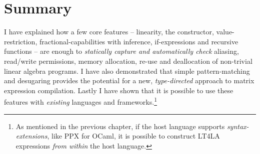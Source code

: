 \section{Summary}


I have explained how a few core features -- linearity, the 
constructor, value-restriction, fractional-capabilities with inference,
if-expressions and recursive functions -- are enough to \emph{statically
capture and automatically check} aliasing, read/write permissions, memory
allocation, re-use and deallocation of non-trivial linear algebra programs. I
have also demonstrated that simple pattern-matching and desugaring provides the
potential for a new, \emph{type-directed} approach to matrix expression
compilation. Lastly I have shown that it is possible to use these features with
\emph{existing} languages and frameworks.\footnote{As mentioned in the previous
    chapter, if the host language supports \emph{syntax-extensions}, like PPX
for OCaml, it is possible to construct LT4LA expressions \emph{from within} the
host language.}

